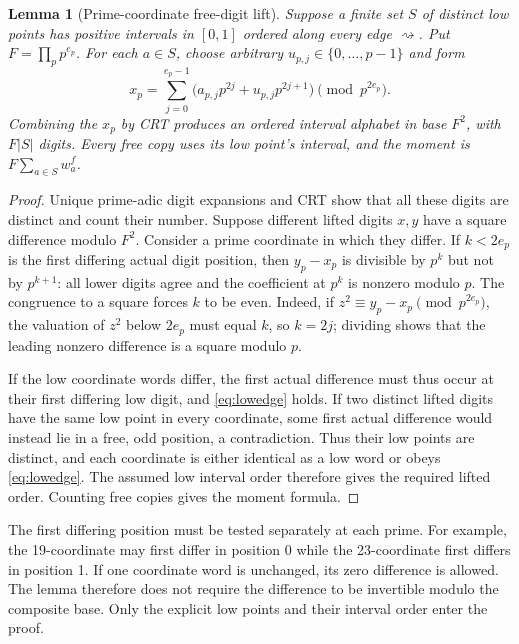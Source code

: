 \documentclass[11pt]{article}
\newtheorem{lemma}[theorem]{Lemma}
\theoremstyle{definition}
\theoremstyle{remark}
\newcommand{\card}[1]{\lvert #1\rvert}
\begin{document}
\begin{lemma}[Prime-coordinate free-digit lift]\label{lem:odd}
Suppose a finite set $S$ of distinct low points has positive intervals in
$[0,1]$ ordered along every edge $\rightsquigarrow$.
Put $F=\prod_pp^{e_p}$. For each $a\in S$, choose arbitrary
$u_{p,j}\in\{0,\ldots,p-1\}$ and form
\begin{equation}\label{eq:oddlift}
 x_p=\sum_{j=0}^{e_p-1}
       \bigl(a_{p,j}p^{2j}+u_{p,j}p^{2j+1}\bigr)\pmod{p^{2e_p}}.
\end{equation}
Combining the $x_p$ by CRT produces an ordered interval alphabet in base
$F^2$, with $F\card S$ digits. Every free copy uses its low point's interval,
and the moment is $F\sum_{a\in S}w_a^f$.
\end{lemma}
\begin{proof}
Unique prime-adic digit expansions and CRT show that all these digits are
distinct and count their number. Suppose different lifted digits $x,y$
have a square difference modulo $F^2$. Consider a prime coordinate in which
they differ. If $k<2e_p$ is the first differing actual digit position, then
$y_p-x_p$ is divisible by $p^k$ but not by $p^{k+1}$: all lower digits
agree and the coefficient at $p^k$ is nonzero modulo $p$.
The congruence to a square forces $k$ to be even. Indeed, if
$z^2\equiv y_p-x_p\pmod{p^{2e_p}}$, the valuation of $z^2$ below
$2e_p$ must equal $k$, so $k=2j$; dividing shows that the leading nonzero
difference is a square modulo $p$.

If the low coordinate words differ, the first actual difference must thus
occur at their first differing low digit, and \eqref{eq:lowedge} holds.
If two distinct lifted digits have the same low point in every coordinate,
some first actual difference would instead lie in a free, odd position,
a contradiction. Thus their low points are distinct, and each coordinate
is either identical as a low word or obeys \eqref{eq:lowedge}. The assumed
low interval order therefore gives the required lifted order. Counting
free copies gives the moment formula.
\end{proof}

The first differing position must be tested separately at each prime.
For example, the 19-coordinate may first differ in position 0 while the
23-coordinate first differs in position 1. If one coordinate word is
unchanged, its zero difference is allowed. The lemma therefore does not
require the difference to be invertible modulo the composite base.
Only the explicit low points and their interval order enter the proof.
\end{document}
